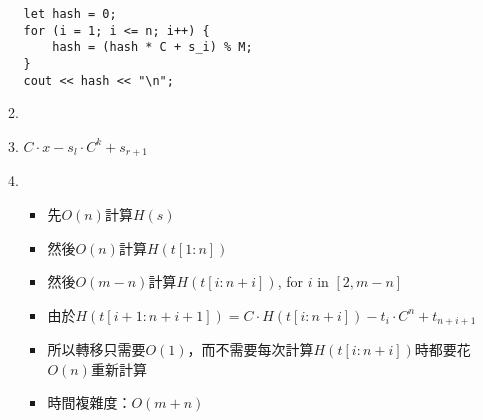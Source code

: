 \documentclass[a4paper, 12pt]{article}
\begin{document}
\begin{enumerate}
\begin{enumerate}
\begin{lstlisting}
let hash = 0;
for (i = 1; i <= n; i++) {
    hash = (hash * C + s_i) % M;
}
cout << hash << "\n";
\end{lstlisting}
                \item                 
                \item $C \cdot x - s_l \cdot C^k + s_{r+1}$
                \item 
                    \begin{itemize}
                        \item 先$O(n)$計算$H(s)$
                        \item 然後$O(n)$計算$H(t[1: n])$
                        \item 然後$O(m-n)$計算$H(t[i: n+i])$, for $i$ in $[2, m-n]$
                        \item 由於$H(t[i+1: n+i+1]) = C \cdot H(t[i: n+i]) - t_i \cdot C^n + t_{n+i+1}$
                        \item 所以轉移只需要$O(1)$，而不需要每次計算$H(t[i: n+i])$時都要花$O(n)$重新計算
                        \item 時間複雜度：$O(m+n)$
                    \end{itemize}
            \end{enumerate}
    \end{enumerate}
\end{document}
